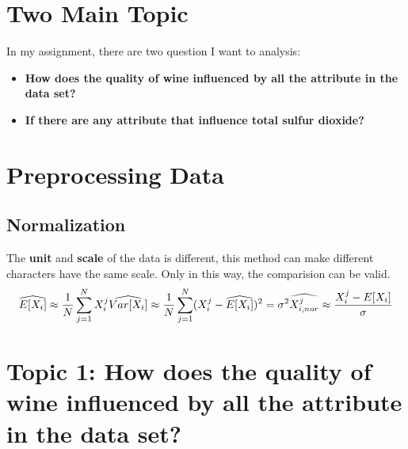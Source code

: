 \documentclass[titlepage,a4paper,12pt,thmsb]{report}
\begin{document}



\chapter*{Two Main Topic}

In my assignment, there are two question I want to analysis:
\newline{}
\begin{itemize}
\item{\bf How does the quality of wine influenced by all the attribute in the data set?}
\item{\bf If there are any attribute that influence total sulfur dioxide?}
\end{itemize}


\chapter*{Preprocessing Data}


\section*{Normalization}
The {\bf unit} and {\bf scale} of the data is different, this method can make different characters have the same scale.  Only in this way, the comparision can be valid.
$$
  \widehat{E[X_i]} \approx \frac{1}{N} \sum_{j=1}^{N} X_i^j \\
  \widehat{Var[X_i]}   \approx \frac{1}{N} \sum_{j=1}^N (X_i^j - \widehat{E[X_i]})^2 = \sigma^2 \\
  \widehat{X_{i,nor}^j}  \approx \frac{X_i^j - E[X_i]}{\sigma}
$$



\chapter{Topic 1: How does the quality of wine influenced by all the attribute in the data set? }
\end{document}
